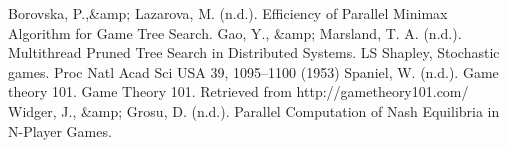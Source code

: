 \documentclass[conference]{IEEEtran}
\begin{document}
\begin{thebibliography}{00}
Borovska, P.,\&amp; Lazarova, M. (n.d.). Efficiency of Parallel Minimax Algorithm for Game Tree Search. 
Gao, Y., \&amp; Marsland, T. A. (n.d.). Multithread Pruned Tree Search in Distributed Systems. 
LS Shapley, Stochastic games. Proc Natl Acad Sci USA 39, 1095–1100 (1953)  
Spaniel, W. (n.d.). Game theory 101. Game Theory 101. Retrieved from http://gametheory101.com/ 
Widger, J., \&amp; Grosu, D. (n.d.). Parallel Computation of Nash Equilibria in N-Player Games. 
\end{thebibliography}
\end{document}
